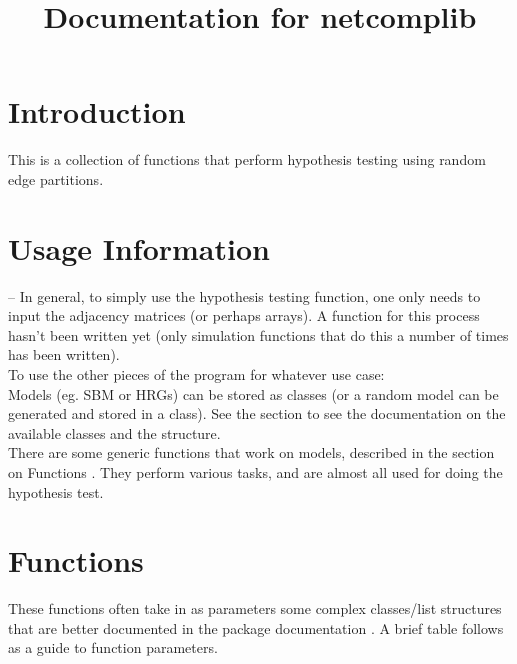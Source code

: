 \documentclass[11pt]{article}
\begin{document}
\title{Documentation for netcomplib}

\maketitle
\tableofcontents
\pagebreak

\listoftodos

\pagebreak

\section{Introduction}

This is a collection of functions that perform hypothesis testing using random edge partitions. 


\section{Usage Information}
 -- In general, to simply use the hypothesis testing function, one only needs to input the adjacency matrices (or perhaps arrays). A function for this process hasn't been written yet (only simulation functions that do this a number of times has been written). \\

To use the other pieces of the program for whatever use case: \\

Models (eg. SBM or HRGs) can be stored as classes (or a random model can be generated and stored in a class). See the section  to see the documentation on the available classes and the structure. \\

There are some generic functions that work on models, described in the section on Functions . They perform various tasks, and are almost all used for doing the hypothesis test. \\

\section{Functions}
These functions often take in as parameters some complex classes/list structures that are better documented in the package documentation . A brief table follows as a guide to function parameters. \\
\end{document}
